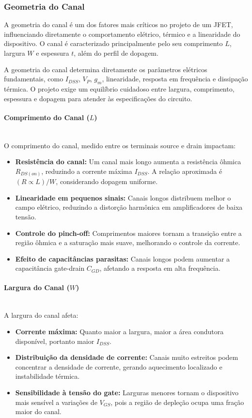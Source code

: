 \documentclass[12pt]{article}
\newcommand{\subsubsubsection}[1]{%
  \paragraph{#1}\mbox{}\\
}
\begin{document}
\subsubsection{Geometria do Canal}

A geometria do canal é um dos fatores mais críticos no projeto de um JFET, influenciando diretamente o comportamento elétrico, térmico e a linearidade do dispositivo. O canal é caracterizado principalmente pelo seu comprimento \(L\), largura \(W\) e espessura \(t\), além do perfil de dopagem.

A geometria do canal determina diretamente os parâmetros elétricos fundamentais, como \(I_{DSS}\), \(V_P\), \(g_m\), linearidade, resposta em frequência e dissipação térmica. O projeto exige um equilíbrio cuidadoso entre largura, comprimento, espessura e dopagem para atender às especificações do circuito.

\subsubsubsection{Comprimento do Canal (\(L\))}

O comprimento do canal, medido entre os terminais source e drain impactam:

\begin{itemize}
    \item \textbf{Resistência do canal:} Um canal mais longo aumenta a resistência ôhmica \(R_{DS(on)}\), reduzindo a corrente máxima \(I_{DSS}\). A relação aproximada é \((R \propto L)/W\), considerando dopagem uniforme.

    \item \textbf{Linearidade em pequenos sinais:} Canais longos distribuem melhor o campo elétrico, reduzindo a distorção harmônica em amplificadores de baixa tensão.

    \item \textbf{Controle do pinch-off:} Comprimentos maiores tornam a transição entre a região ôhmica e a saturação mais suave, melhorando o controle da corrente.

    \item \textbf{Efeito de capacitâncias parasitas:} Canais longos podem aumentar a capacitância gate-drain \(C_{GD}\), afetando a resposta em alta frequência.
\end{itemize}

\subsubsubsection{Largura do Canal (\(W\))}

A largura do canal afeta:

\begin{itemize}
    \item \textbf{Corrente máxima:} Quanto maior a largura, maior a área condutora disponível, portanto maior \(I_{DSS}\).
    \item \textbf{Distribuição da densidade de corrente:} Canais muito estreitos podem concentrar a densidade de corrente, gerando aquecimento localizado e instabilidade térmica.
    \item \textbf{Sensibilidade à tensão do gate:} Larguras menores tornam o dispositivo mais sensível a variações de \(V_{GS}\), pois a região de depleção ocupa uma fração maior do canal.
\end{itemize}
\end{document}
